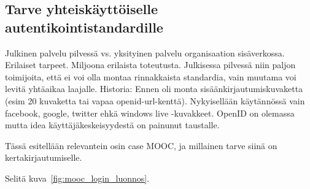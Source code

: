 \documentclass[finnish,gradu]{tktltiki}
\begin{document}







  \subsection{Tarve yhteiskäyttöiselle autentikointistandardille} %
  \label{sub:tarve_yhteiskäyttöiselle_autentikointistandardille}
  Julkinen palvelu pilvessä vs. yksityinen palvelu organisaation sisäverkossa. Erilaiset tarpeet. Miljoona erilaista toteutusta. Julkisessa pilvessä niin paljon toimijoita, että ei voi olla montaa rinnakkaista standardia, vain muutama voi levitä yhtäaikaa laajalle. Historia: Ennen oli monta sisäänkirjautumiskuvaketta (esim 20 kuvaketta tai vapaa openid-url-kenttä). Nykyisellään käytännössä vain facebook, google, twitter ehkä windows live -kuvakkeet. OpenID on olemassa mutta idea käyttäjäkeskeisyydestä on painunut taustalle.

  Tässä esitellään relevantein osin case MOOC, ja millainen tarve siinä on kertakirjautumiselle.


  Selitä kuva~\ref{fig:mooc_login_luonnos}.
\end{document}
